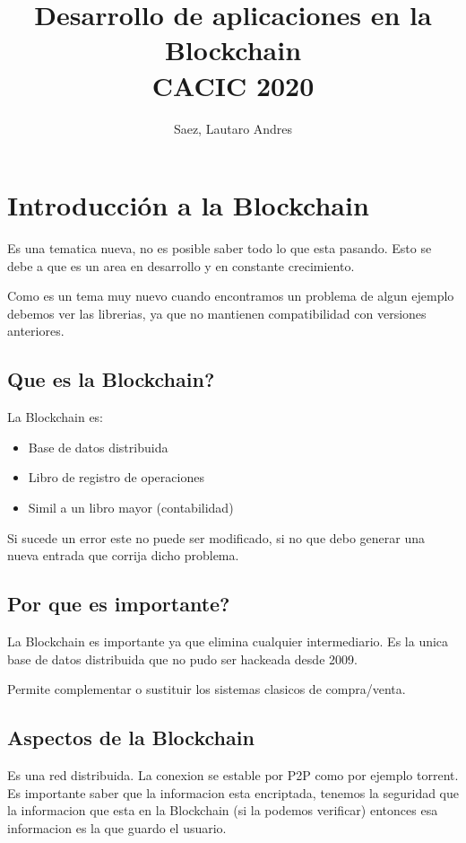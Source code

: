 \documentclass[]{book}
\title{Desarrollo de aplicaciones en la Blockchain \\ CACIC 2020}
\author{Saez, Lautaro Andres}
\date{}
\begin{document}
    \maketitle
    \tableofcontents
    \chapter{ Introducción a la Blockchain }

    Es una tematica nueva, no es posible saber todo lo que esta pasando. Esto se 
    debe a que es un area en desarrollo y en constante crecimiento.

    Como es un tema muy nuevo cuando encontramos un problema de algun ejemplo 
    debemos ver las librerias, ya que no mantienen compatibilidad con versiones anteriores.

    \section{Que es la Blockchain?}

    La Blockchain es: 

    \begin{itemize}
        \item Base de datos distribuida
        \item Libro de registro de operaciones
        \item Simil a un libro mayor (contabilidad)
    \end{itemize}

    Si sucede un error este no puede ser modificado, si no que debo generar una nueva entrada 
    que corrija dicho problema.

    \section{Por que es importante?}

    La Blockchain es importante ya que elimina cualquier intermediario.
    Es la unica base de datos distribuida que no pudo ser hackeada desde 2009.

    Permite complementar o sustituir los sistemas clasicos de compra/venta.

    \section{Aspectos de la Blockchain}

    Es una red distribuida. La conexion se estable por P2P como por ejemplo torrent. 
    Es importante saber que la informacion esta encriptada, tenemos la seguridad que la informacion 
    que esta en la Blockchain (si la podemos verificar) entonces esa informacion es la que guardo el usuario.
\end{document}
